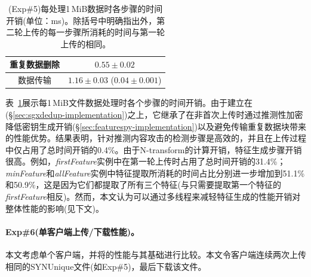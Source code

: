 \begin{table}[!htb]
{\begin{tabular}{|c|c|c|c|c|}
            \multicolumn{2}{|c|}{重复数据删除}                 &
            \multicolumn{3}{c|}{$0.55 \pm 0.02$}                                                                                                            \\ \hline
            \multicolumn{2}{|c|}{数据传输}                     & \multicolumn{3}{c|}{$1.16 \pm 0.03$ ($0.04 \pm 0.001$)}                                    \\ \hline
        \end{tabular}
    }
    \caption{(Exp\#5)每处理1\,MiB数据时各步骤的时间开销(单位：ms)。除括号中明确指出外，第二轮上传的每一步骤所消耗的时间与第一轮上传的相同。}
    \label{tab:featurespy-evaluation-syn-system-breakdown}
\end{table}

表~\ref{tab:featurespy-evaluation-syn-system-breakdown}展示每1\,MiB文件数据处理时各个步骤的时间开销。由于\prototype 建立在\sysnameS(\S\ref{sec:sgxdedup-implementation})之上，它继承了在非首次上传时通过推测性加密降低密钥生成开销(\S\ref{sec:featurespy-implementation})以及避免传输重复数据块带来的性能优势。结果表明，针对推测内容攻击的检测步骤是高效的，并且在上传过程中仅占用了总时间开销的0.4\%。由于N-transform的计算开销，特征生成步骤开销很高。例如，\textit{firstFeature}实例中在第一轮上传时占用了总时间开销的31.4\%；\textit{minFeature}和\textit{allFeature}实例中特征提取所消耗的时间占比分别进一步增加到51.1\%和50.9\%，这是因为它们都提取了所有三个特征(与只需要提取第一个特征的\textit{firstFeature}相反)。然而，本文认为可以通过多线程来减轻特征生成的性能开销对\prototype 整体性能的影响(见下文)。

\paragraph*{Exp\#6(单客户端上传/下载性能)。}
本文考虑单个客户端，并将\prototype 的性能与其基础\sysnameS 进行比较。本文令客户端连续两次上传相同的SYNUnique文件(如Exp\#5)，最后下载该文件。

